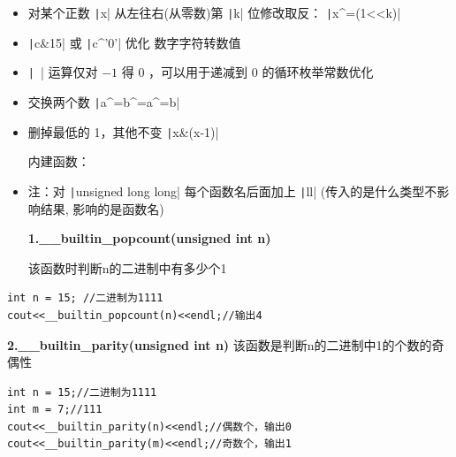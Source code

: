 \documentclass[twocolumn,10pt]{ctexart}
\begin{document}
\begin{itemize}
\item 对某个正数 \texttt|x| 从左往右(从零数)第 \texttt|k| 位修改取反： \texttt|x^=(1<<k)|
\end{itemize}

\begin{itemize}
\item \texttt|c&15|  或 \texttt|c^'0'| 优化 数字字符转数值
\end{itemize}

\begin{itemize}
\item \begin{notebox}
\texttt|~| 运算仅对 $-1$ 得 $0$ ，可以用于递减到 0 的循环枚举常数优化
\end{notebox}
\end{itemize}

\begin{itemize}
\item 交换两个数 \texttt|a^=b^=a^=b|
\end{itemize}

\begin{itemize}
\item 删掉最低的 1，其他不变 \texttt|x&(x-1)|

内建函数：
\end{itemize}

\begin{itemize}
\item 注：对 \texttt|unsigned long long| 每个函数名后面加上 \texttt|ll| (传入的是什么类型不影响结果, 影响的是函数名)

\textbf{1.\_\_builtin\_popcount(unsigned int n)}

该函数时判断n的二进制中有多少个1
\end{itemize}

\begin{verbatim}
int n = 15; //二进制为1111
cout<<__builtin_popcount(n)<<endl;//输出4
\end{verbatim}

\textbf{2.\_\_builtin\_parity(unsigned int n)} 该函数是判断n的二进制中1的个数的奇偶性

\begin{verbatim}
int n = 15;//二进制为1111
int m = 7;//111
cout<<__builtin_parity(n)<<endl;//偶数个，输出0
cout<<__builtin_parity(m)<<endl;//奇数个，输出1
\end{verbatim}
\end{document}

